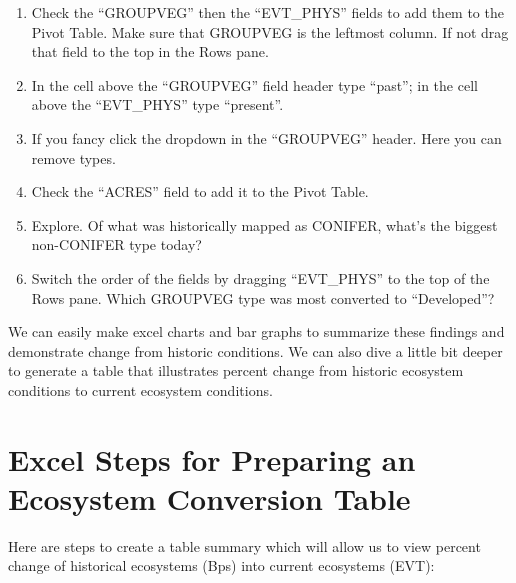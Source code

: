 \documentclass[
]{book}
\providecommand{\tightlist}{%
  \setlength{\itemsep}{0pt}\setlength{\parskip}{0pt}}
\begin{document}
\begin{enumerate}
\def\labelenumi{\arabic{enumi}.}
\tightlist
\item
  Check the ``GROUPVEG'' then the ``EVT\_PHYS'' fields to add them to the Pivot Table. Make sure that GROUPVEG is the leftmost column. If not drag that field to the top in the Rows pane.
\item
  In the cell above the ``GROUPVEG'' field header type ``past''; in the cell above the ``EVT\_PHYS'' type ``present''.
\item
  If you fancy click the dropdown in the ``GROUPVEG'' header. Here you can remove types.
\item
  Check the ``ACRES'' field to add it to the Pivot Table.
\item
  Explore. Of what was historically mapped as CONIFER, what's the biggest non-CONIFER type today?
\item
  Switch the order of the fields by dragging ``EVT\_PHYS'' to the top of the Rows pane. Which GROUPVEG type was most converted to ``Developed''?
\end{enumerate}

We can easily make excel charts and bar graphs to summarize these findings and demonstrate change from historic conditions. We can also dive a little bit deeper to generate a table that illustrates percent change from historic ecosystem conditions to current ecosystem conditions.

\hypertarget{excel-steps-for-preparing-an-ecosystem-conversion-table}{%
\section{Excel Steps for Preparing an Ecosystem Conversion Table}\label{excel-steps-for-preparing-an-ecosystem-conversion-table}}

Here are steps to create a table summary which will allow us to view percent change of historical ecosystems (Bps) into current ecosystems (EVT):
\end{document}
